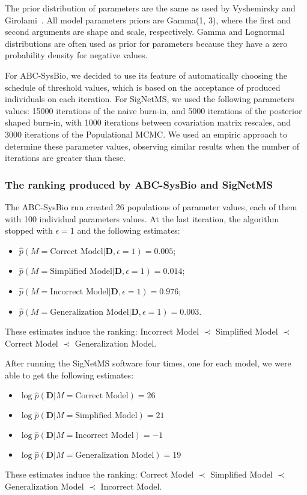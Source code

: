 The prior distribution of parameters are the same as used by Vyshemirsky
and Girolami~\cite{Vyshemirsky2007}. All model parameters priors are
Gamma(1, 3), where the first and second arguments are shape and scale,
respectively. Gamma and Lognormal distributions are often used as prior 
for parameters because they have a zero probability density for negative
values.

For ABC-SysBio, we decided to use its feature of automatically choosing
the schedule of threshold values, which is based on the acceptance of
produced individuals on each iteration. For SigNetMS, we used the
following parameters values: 15000 iterations of the naive burn-in, and
5000 iterations of the posterior shaped burn-in, with 1000 iterations
between covariation matrix rescales, and 3000 iterations of the
Populational MCMC. We used an empiric approach to determine these
parameter values, observing similar results when the number of
iterations are greater than these.

\subsubsection{The ranking produced by ABC-SysBio and SigNetMS}
The ABC-SysBio run created 26 populations of parameter values, each of 
them with 100 individual parameters values. At the last iteration, the 
algorithm stopped with $\epsilon = 1$ and the following estimates: 
\begin{itemize}
    \item{$\hat{p} (M = \text{Correct Model} | {\bm D}, \epsilon = 1) =
        0.005$;}
    \item{$\hat{p} (M = \text{Simplified Model} | {\bm D}, \epsilon = 1)
        = 0.014$;} 
    \item{$\hat{p} (M = \text{Incorrect Model} | {\bm D}, \epsilon = 1)
        = 0.976$;}
    \item{$\hat{p} (M = \text{Generalization Model} | {\bm D}, \epsilon
        = 1) = 0.003$.}
\end{itemize}
These estimates induce the ranking: Incorrect Model $\prec$ Simplified 
Model $\prec$ Correct Model $\prec$ Generalization Model.

After running the SigNetMS software four times, one for each model, we
were able to get the following estimates:
\begin{itemize}
    \item{$\log \hat{p}({\bm D} | M = \text{Correct Model}) = 26$}
    \item{$\log \hat{p}({\bm D} | M = \text{Simplified Model}) = 21$}
    \item{$\log \hat{p}({\bm D} | M = \text{Incorrect Model}) = -1$}
    \item{$\log \hat{p}({\bm D} | M = \text{Generalization Model}) =
        19$}
\end{itemize}
These estimates induce the ranking: Correct Model $\prec$ Simplified
Model $\prec$ Generalization Model $\prec$ Incorrect Model.

